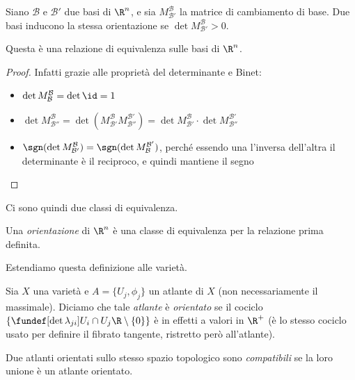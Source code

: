 
Siano $\mathcal{B}$ e $\mathcal{B'}$ due basi di $\R^n$, e sia $M^{\mathcal{B}}_{\mathcal{B'}}$ la matrice di cambiamento di base.
Due basi inducono la stessa orientazione se $\det M^{\mathcal{B}}_{\mathcal{B'}}>0$.

\begin{prop}
Questa è una relazione di equivalenza sulle basi di $\R^n$.
\end{prop}
\begin{proof}
Infatti grazie alle proprietà del determinante e Binet:
\begin{itemize}
\item $\det M^{\mathcal{B}}_{\mathcal{B}} = \det \id = 1$
\item $\det M^{\mathcal{B}}_{\mathcal{B''}} = \det ( M^{\mathcal{B}}_{\mathcal{B'}}  M^{\mathcal{B'}}_{\mathcal{B''}})= \det  M^{\mathcal{B}}_{\mathcal{B'}} \cdot \det  M^{\mathcal{B'}}_{\mathcal{B''}}$
\item $\sgn(\det M^{\mathcal{B}}_{\mathcal{B'}}) = \sgn(\det  M^{\mathcal{B'}}_{\mathcal{B}})$, perché essendo una l'inversa dell'altra il determinante è il reciproco, e quindi mantiene il segno
\qedhere
\end{itemize}
\end{proof}

\noindent Ci sono quindi due classi di equivalenza.

\begin{defn}[Orientazione]
Una \emph{orientazione} di $\R^n$ è una classe di equivalenza per la relazione prima definita.
\end{defn}

Estendiamo questa definizione alle varietà.

\begin{defn}
Sia $X$ una varietà e $A = \{U_j, \phi_j\}$ un atlante di $X$ (non necessariamente il massimale). Diciamo che tale \emph{atlante} è \emph{orientato} se il cociclo $\{\fundef[\det \lambda_{ji}]{U_i \cap U_j}{\R\setminus\{0\}}\}$ è in effetti a valori in $\R^+$ (è lo stesso cociclo usato per definire il fibrato tangente, ristretto però all'atlante).
\end{defn}

\begin{defn}
Due atlanti orientati sullo stesso spazio topologico sono \emph{compatibili} se la loro unione è un atlante orientato.
\end{defn}

